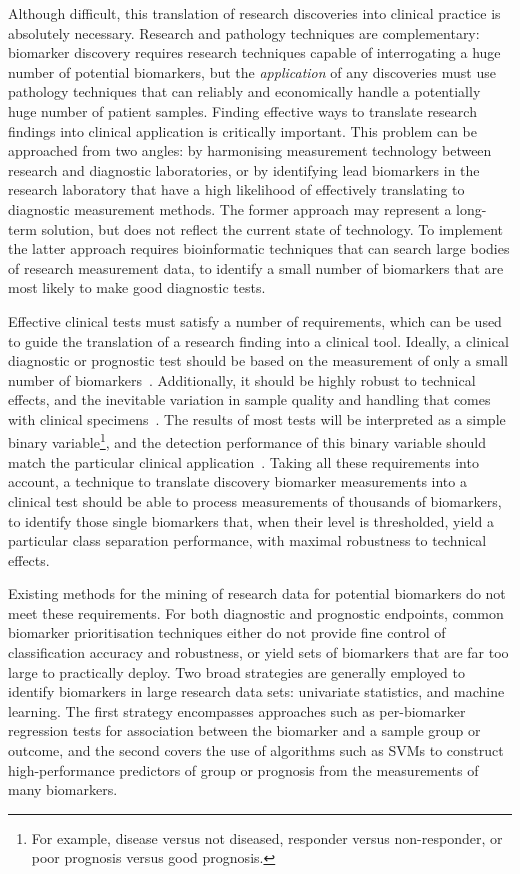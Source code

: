 \documentclass[dissertation.tex]{subfiles}
\begin{document}
Although difficult, this translation of research discoveries into clinical practice is absolutely necessary.  Research and pathology techniques are complementary: biomarker discovery requires research techniques capable of interrogating a huge number of potential biomarkers, but the \emph{application} of any discoveries must use pathology techniques that can reliably and economically handle a potentially huge number of patient samples.  Finding effective ways to translate research findings into clinical application is critically important.  This problem can be approached from two angles: by harmonising measurement technology between research and diagnostic laboratories, or by identifying lead biomarkers in the research laboratory that have a high likelihood of effectively translating to diagnostic measurement methods.  The former approach may represent a long-term solution, but does not reflect the current state of technology.  To implement the latter approach requires bioinformatic techniques that can search large bodies of research measurement data, to identify a small number of biomarkers that are most likely to make good diagnostic tests.

Effective clinical tests must satisfy a number of requirements, which can be used to guide the translation of a research finding into a clinical tool.  Ideally, a clinical diagnostic or prognostic test should be based on the measurement of only a small number of biomarkers~\cite{Lesko2001, Pepe2001}.  Additionally, it should be highly robust to technical effects, and the inevitable variation in sample quality and handling that comes with clinical specimens~\cite{Hewitt2008}.  The results of most tests will be interpreted as a simple binary variable\footnote{For example, disease versus not diseased, responder versus non-responder, or poor prognosis versus good prognosis.}, and the detection performance of this binary variable should match the particular clinical application~\cite{Pepe2001}.  Taking all these requirements into account, a technique to translate discovery biomarker measurements into a clinical test should be able to process measurements of thousands of biomarkers, to identify those single biomarkers that, when their level is thresholded, yield a particular class separation performance, with maximal robustness to technical effects.

Existing methods for the mining of research data for potential biomarkers do not meet these requirements.  For both diagnostic and prognostic endpoints, common biomarker prioritisation techniques either do not provide fine control of classification accuracy and robustness, or yield sets of biomarkers that are far too large to practically deploy.  Two broad strategies are generally employed to identify biomarkers in large research data sets: univariate statistics, and machine learning.  The first strategy encompasses approaches such as per-biomarker regression tests for association between the biomarker and a sample group or outcome, and the second covers the use of algorithms such as \glspl{SVM} to construct high-performance predictors of group or prognosis from the measurements of many biomarkers.
\end{document}
